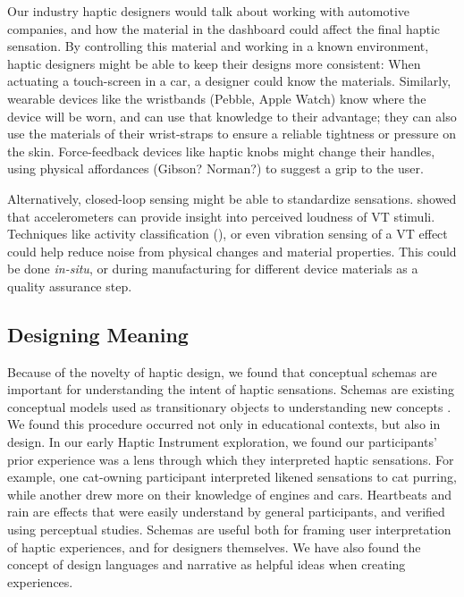 Our industry haptic designers would talk about working with automotive companies, and how the material in the dashboard could affect the final haptic sensation.
By controlling this material and working in a known environment, haptic designers might be able to keep their designs more consistent:
When actuating a touch-screen in a car, a designer could know the materials.
Similarly, wearable devices like the wristbands (Pebble, Apple Watch) know where the device will be worn, and can use that knowledge to their advantage; they can also use the materials of their wrist-straps to ensure a reliable tightness or pressure on the skin.
Force-feedback devices like haptic knobs might change their handles, using physical affordances (Gibson? Norman?) to suggest a grip to the user.

Alternatively, closed-loop sensing might be able to standardize sensations.
\citet{Blum2015} showed that accelerometers can provide insight into perceived loudness of VT stimuli.
Techniques like activity classification (\eg \cite{Schneider2013}), or even vibration sensing of a VT effect could help reduce noise from physical changes and material properties.
This could be done \emph{in-situ}, or during manufacturing for different device materials as a quality assurance step.

%
%
\subsection{Designing Meaning}
Because of the novelty of haptic design, we found that conceptual schemas are important for understanding the intent of haptic sensations.
Schemas are existing conceptual models used as transitionary objects to understanding new concepts \cite{Papert1980}.
We found this procedure occurred not only in educational contexts, but also in design.
In our early Haptic Instrument exploration, we found our participants' prior experience was a lens through which they interpreted haptic sensations.
For example, one cat-owning participant interpreted likened sensations to cat purring, while another drew more on their knowledge of engines and cars.
Heartbeats and rain \cite{Israr2014} are effects that were easily understand by general participants, and verified using perceptual studies.
Schemas are useful both for framing user interpretation of haptic experiences, and for designers themselves.
We have also found the concept of design languages and narrative as helpful ideas when creating experiences.

